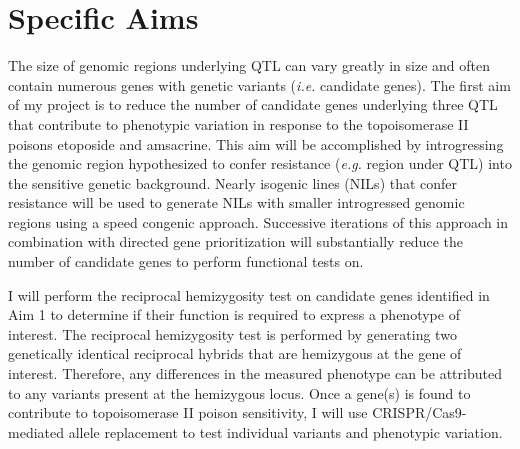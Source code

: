 \documentclass[12pt]{article}
\begin{document}
\newpage


\pagestyle{fancy}
\section{Specific Aims}
\fancyhf{}
\renewcommand{\footrulewidth}{1pt}

 The size of genomic regions underlying QTL can vary greatly in size and often contain numerous genes with genetic variants ({\it i.e.} candidate genes). The first aim of my project is to reduce the number of candidate genes underlying three QTL that contribute to phenotypic variation in response to the topoisomerase II poisons etoposide and amsacrine. This aim will be accomplished by introgressing the genomic region hypothesized to confer resistance ({\it e.g.} region under QTL) into the sensitive genetic background. Nearly isogenic lines (NILs) that confer resistance will be used to generate NILs with smaller introgressed genomic regions using a speed congenic approach. Successive iterations of this approach in combination with directed gene prioritization will substantially reduce the number of candidate genes to perform functional tests on. 
\vspace{10pt}

 I will perform the reciprocal hemizygosity test on candidate genes identified in Aim 1 to determine if their function is required to express a phenotype of interest. The reciprocal hemizygosity test is performed by generating two genetically identical reciprocal hybrids that are hemizygous at the gene of interest. Therefore, any differences in the measured phenotype can be attributed to any variants present at the hemizygous locus. Once a gene(s) is found to contribute to topoisomerase II poison sensitivity, I will use CRISPR/Cas9-mediated allele replacement to test individual variants and phenotypic variation. 
\vspace{10pt}
\end{document}
